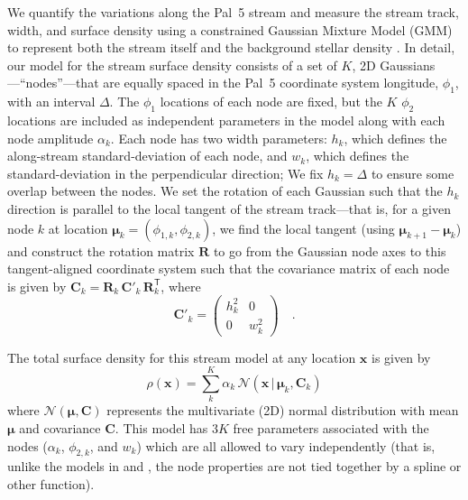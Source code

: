 \documentclass[twocolumn]{aastex62}
\newcommand{\bs}[1]{\boldsymbol{#1}}
\newcommand{\given}{\,|\,}
\newcommand{\transpose}[1]{{#1}^{\!\mathsf{T}}}
\newcommand{\mat}[1]{\mathbf{#1}}
\begin{document}
We quantify the variations along the Pal~5 stream and measure the stream track, width, and surface density using a constrained Gaussian Mixture Model (GMM) to represent both the stream itself and the background stellar density \citep[our model is similar to, but more flexible than, past work that use GMMs to model streams][]{Erkal:2017, Koposov:2019}.
In detail, our model for the stream surface density consists of a set of $K$, 2D Gaussians---``nodes''---that are equally spaced in the Pal~5 coordinate system longitude, $\phi_1$, with an interval $\Delta$.
The $\phi_1$ locations of each node are fixed, but the $K$ $\phi_2$ locations are included as independent parameters in the model along with each node amplitude $\alpha_k$.
Each node has two width parameters: $h_k$, which defines the along-stream standard-deviation of each node, and $w_k$, which defines the standard-deviation in the perpendicular direction; We fix $h_k = \Delta$ to ensure some overlap between the nodes.
We set the rotation of each Gaussian such that the $h_k$ direction is parallel to the local tangent of the stream track---that is, for a given node $k$ at location $\bs{\mu}_k = (\phi_{1,k}, \phi_{2,k})$, we find the local tangent (using $\bs{\mu}_{k+1} - \bs{\mu}_k$) and construct the rotation matrix $\mat{R}$ to go from the Gaussian node axes to this tangent-aligned coordinate system such that the covariance matrix of each node is given by $\mat{C}_k = \mat{R}_k \, \mat{C}'_k \, \transpose{\mat{R}}_k$, where
\begin{equation}
    \mat{C}'_k =
    \begin{pmatrix}
        h_k^2 & 0 \\
        0 & w_k^2
    \end{pmatrix} \quad .
\end{equation}

The total surface density for this stream model at any location $\bs{x}$ is given by
\begin{equation}
    \rho(\bs{x}) = \sum_k^K \alpha_k \, \mathcal{N}(\bs{x} \given \bs{\mu}_k, \mat{C}_k)
\end{equation}
where $\mathcal{N}(\bs{\mu}, \mat{C})$ represents the multivariate (2D) normal distribution with mean $\bs{\mu}$ and covariance $\mat{C}$.
This model has $3 K$ free parameters associated with the nodes ($\alpha_k$, $\phi_{2, k}$, and $w_k$) which are all allowed to vary independently (that is, unlike the models in \cite{Erkal:2017} and \cite{Koposov:2019}, the node properties are not tied together by a spline or other function).
\end{document}
